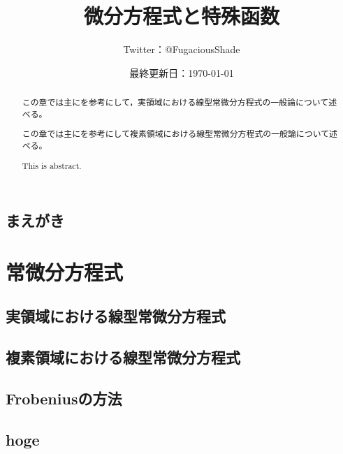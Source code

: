 \documentclass[b5paper,oneside,openany]{ltjsbook} %
\title{微分方程式と特殊函数}
\author{Twitter：@FugaciousShade}
\date{最終更新日：\today}
\begin{document}
\maketitle %

\chapter*{まえがき}{
    
}

\setcounter{tocdepth}{4}  %
\tableofcontents  %




\part{常微分方程式}
\chapter{実領域における線型常微分方程式}{
    \begin{abstract}
        この章では主に\cite{takano}を参考にして，実領域における線型常微分方程式の一般論について述べる。
    \end{abstract}
    
}

\chapter{複素領域における線型常微分方程式}{
    \begin{abstract}
        この章では主に\cite{takano}を参考にして複素領域における線型常微分方程式の一般論について述べる。
    \end{abstract}
}

\chapter{Frobeniusの方法}{
    \begin{abstract}
        This is abstract.
    \end{abstract}
    
}


\appendix
{}
\chapter{hoge}{
}
\fi




\end{document}
